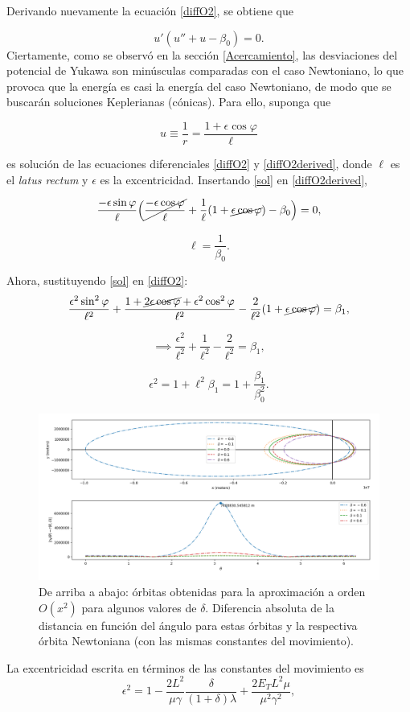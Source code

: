 \documentclass{article}
\begin{document}
Derivando nuevamente la ecuación \eqref{diffO2}, se obtiene que

\begin{equation}\label{diffO2derived}
	u'(u''+u-\beta_0)=0.
\end{equation}
Ciertamente, como se observó en la sección \ref{Acercamiento}, las desviaciones del potencial de Yukawa son minúsculas comparadas con el caso Newtoniano, lo que provoca que la energía es casi la energía del caso Newtoniano, de modo que se buscarán soluciones Keplerianas (cónicas). Para ello, suponga que

\begin{equation}\label{sol}
	u\equiv\frac{1}{r}=\frac{1+\epsilon\cos\varphi}{\ell}
\end{equation} 

es solución de las ecuaciones diferenciales \eqref{diffO2} y \eqref{diffO2derived}, donde $\ell$ es el \textit{latus rectum} y $\epsilon$ es la excentricidad. Insertando \eqref{sol} en \eqref{diffO2derived},

$$\frac{-\epsilon\sin\varphi}{\ell}\Big(\cancel{\frac{-\epsilon\cos\varphi}{\ell}}+\frac{1}{\ell}(1+\cancel{\epsilon\cos\varphi})-\beta_0\Big)=0,$$

\begin{equation}\label{latusO2}
	\boxed{\ell=\frac{1}{\beta_0}.}
\end{equation}

Ahora, sustituyendo \eqref{sol} en \eqref{diffO2}:
$$\frac{\epsilon^2\sin^2\varphi}{\ell^2}+\frac{1+\cancel{2\epsilon\cos\varphi}+\epsilon^2\cos^2\varphi}{\ell^2}-\frac{2}{\ell^2}(1+\cancel{\epsilon\cos\varphi})=\beta_1,$$

$$\implies \frac{\epsilon^2}{\ell^2}+\frac{1}{\ell^2}-\frac{2}{\ell^2}=\beta_1,$$

\begin{equation}\label{eccentricityO2}
	\boxed{\epsilon^2=1+\ell^2\beta_1=1+\frac{\beta_1}{\beta_0^2}.}
\end{equation}
\begin{figure}
	\centering
	\includegraphics[width=.8\textwidth]{../orbits2.png}
	\caption{De arriba a abajo: órbitas obtenidas para la aproximación a orden $O(x^2)$ para algunos valores de $\delta$. Diferencia absoluta de la distancia en función del ángulo para estas órbitas y la respectiva órbita Newtoniana (con las mismas constantes del movimiento).}
	\label{fig:orbitas2}
\end{figure}
La excentricidad escrita en términos de las constantes del movimiento es
\begin{equation}
	\epsilon^2=1-\frac{2L^2}{\mu\gamma}\frac{\delta}{(1+\delta)\lambda}+\frac{2E_TL^2\mu}{\mu^2\gamma^2},
\end{equation}
\end{document}
